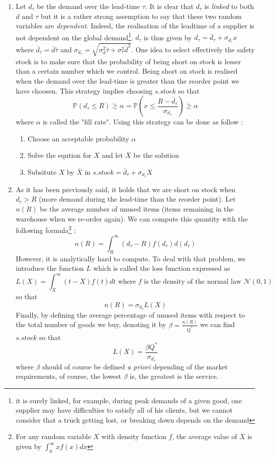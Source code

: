 \begin{enumerate}
    \item Let $d_\tau$ be the demand over the lead-time $\tau$. It is clear that $d_\tau$ is \emph{linked} to both $d$ and $\tau$ but it is a rather strong assemption to say that these two random variables are \emph{dependent}. Indeed, the realisation of the leadtime of a supplier is not dependent on the global demand\footnote{it is surely linked, for example, during peak demands of a given good, one supplier may have difficulties to satisfy all of his clients, but we cannot consider that a truck getting lost, or breaking down depends on the demand}. $d_\tau$ is thus given by $d_\tau = \bar d_\tau + \sigma_{d_\tau}x $ where $\bar d_\tau = \bar d\bar\tau$ and $\sigma_{d_\tau}=\sqrt{ \sigma_d^2\bar\tau + \sigma_\tau^2\bar d^2 }$. One idea to select effectively the safety stock is to make sure that the probability of being short on stock is lesser than a certain number which we control. Being short on stock is realised when the demand over the lead-time is greater than the reorder point we have choosen. This strategy implies choosing $s.stock$ so that \[ \mathbb P(d_\tau\le R)\ge\alpha = \mathbb P\left(x\le\frac{R-\bar d_\tau}{\sigma_{d_\tau}}\right)\ge\alpha \] where $\alpha$ is called the "fill rate". 
    Using this strategy can be done as follow : 
    \begin{enumerate}
        \item Choose an acceptable probability $\alpha$
        \item Solve the eqution for $X$ and let $\bar X$ be the solution
        \item Subsitute $X$ by $\bar X$ in $s.stock = \bar d_\tau + \sigma_{d_\tau}X$
    \end{enumerate}
    \item As it has been previously said, it holds that we are short on stock when $d_\tau > R$ (more demand during the lead-time than the reorder point). Let $n(R)$ be the average number of unused items (items remaining in the warehouse when we re-order again).  We can compute this quantity with the following formula\footnote{For any random variable $X$ with density function $f$, the average value of $X$ is given by $\int_0^\infty xf(x)dx$} : \[ n(R) = \int_R^\infty (d_\tau-R)f(d_\tau)d(d_\tau) \] However, it is analytically hard to compute. To deal with that problem, we introduce the function $L$ which is called the loss function expressed as \[ L(X) = \int_X^\infty(t-X)f(t)dt\textrm{ where }f\textrm{ is the density of the normal law }\mathcal N(0,1) \] so that \[ n(R) = \sigma_{d_\tau}L(X) \] Finally, by defining the average percentage of unused items with respect to the total number of goods we buy, denoting it by $\beta=\frac{n(R)}{Q^*}$ we can find $s.stock$ so that \[ L(X) = \frac{\beta Q^*}{\sigma_{d_\tau}} \] where $\beta$ should of course be defined \emph{a priori} depending of the market requirements, of course, the lowest $\beta$ is, the greatest is the service.


\end{enumerate}

